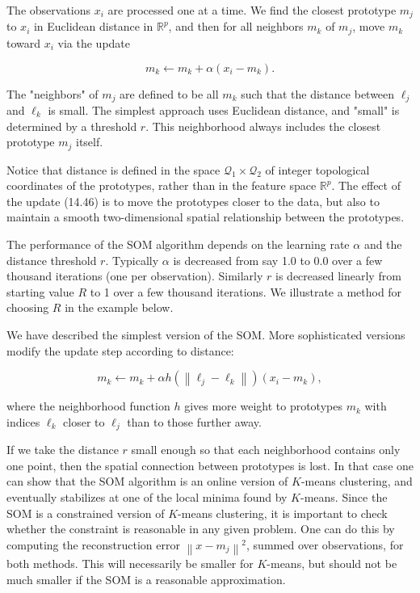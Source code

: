 \documentclass[10pt]{article}
\begin{document}
The observations $x_{i}$ are processed one at a time. We find the closest prototype $m_{j}$ to $x_{i}$ in Euclidean distance in $\mathbb{R}^{p}$, and then for all neighbors $m_{k}$ of $m_{j}$, move $m_{k}$ toward $x_{i}$ via the update


\begin{equation*}
m_{k} \leftarrow m_{k}+\alpha\left(x_{i}-m_{k}\right) . \tag{14.46}
\end{equation*}


The "neighbors" of $m_{j}$ are defined to be all $m_{k}$ such that the distance between $\ell_{j}$ and $\ell_{k}$ is small. The simplest approach uses Euclidean distance, and "small" is determined by a threshold $r$. This neighborhood always includes the closest prototype $m_{j}$ itself.

Notice that distance is defined in the space $\mathcal{Q}_{1} \times \mathcal{Q}_{2}$ of integer topological coordinates of the prototypes, rather than in the feature space $\mathbb{R}^{p}$. The effect of the update (14.46) is to move the prototypes closer to the data, but also to maintain a smooth two-dimensional spatial relationship between the prototypes.

The performance of the SOM algorithm depends on the learning rate $\alpha$ and the distance threshold $r$. Typically $\alpha$ is decreased from say 1.0 to 0.0 over a few thousand iterations (one per observation). Similarly $r$ is decreased linearly from starting value $R$ to 1 over a few thousand iterations. We illustrate a method for choosing $R$ in the example below.

We have described the simplest version of the SOM. More sophisticated versions modify the update step according to distance:


\begin{equation*}
m_{k} \leftarrow m_{k}+\alpha h\left(\left\|\ell_{j}-\ell_{k}\right\|\right)\left(x_{i}-m_{k}\right), \tag{14.47}
\end{equation*}


where the neighborhood function $h$ gives more weight to prototypes $m_{k}$ with indices $\ell_{k}$ closer to $\ell_{j}$ than to those further away.

If we take the distance $r$ small enough so that each neighborhood contains only one point, then the spatial connection between prototypes is lost. In that case one can show that the SOM algorithm is an online version of $K$-means clustering, and eventually stabilizes at one of the local minima found by $K$-means. Since the SOM is a constrained version of $K$-means clustering, it is important to check whether the constraint is reasonable in any given problem. One can do this by computing the reconstruction error $\left\|x-m_{j}\right\|^{2}$, summed over observations, for both methods. This will necessarily be smaller for $K$-means, but should not be much smaller if the SOM is a reasonable approximation.
\end{document}
